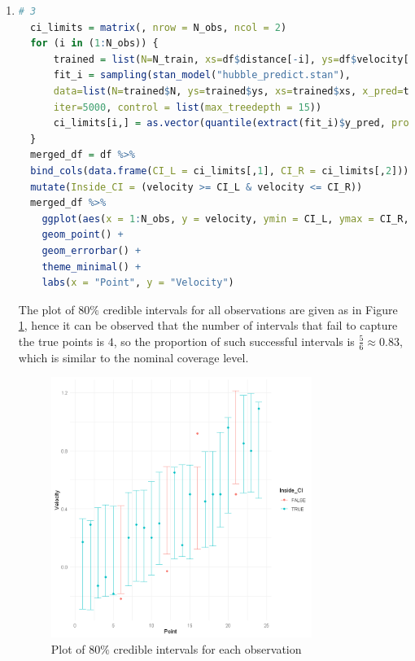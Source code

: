 \documentclass{article}
\begin{document}
\begin{enumerate}
\item 
\begin{lstlisting}[language=R]
  # 3
  ci_limits = matrix(, nrow = N_obs, ncol = 2)
  for (i in (1:N_obs)) {
      trained = list(N=N_train, xs=df$distance[-i], ys=df$velocity[-i], x_pred=df$distance[i])
      fit_i = sampling(stan_model("hubble_predict.stan"), 
      data=list(N=trained$N, ys=trained$ys, xs=trained$xs, x_pred=trained$x_pred), 
      iter=5000, control = list(max_treedepth = 15))
      ci_limits[i,] = as.vector(quantile(extract(fit_i)$y_pred, prob=c(0.1, 0.9)))
  }
  merged_df = df %>% 
  bind_cols(data.frame(CI_L = ci_limits[,1], CI_R = ci_limits[,2])) %>% 
  mutate(Inside_CI = (velocity >= CI_L & velocity <= CI_R)) 
  merged_df %>% 
    ggplot(aes(x = 1:N_obs, y = velocity, ymin = CI_L, ymax = CI_R, color=Inside_CI)) +
    geom_point() + 
    geom_errorbar() +
    theme_minimal() +
    labs(x = "Point", y = "Velocity")
\end{lstlisting}
The plot of $80\%$ credible intervals for all observations are given as in Figure \ref{fig:ci}, hence it can be observed that the number of intervals that fail to capture the true points is $4$, so the proportion of such successful intervals is $\frac56 \approx 0.83$, which is similar to the nominal coverage level.
\begin{figure}[H]
  \centering
  \includegraphics[width=0.8\textwidth, height=0.4\textheight]{ci.png}
  \caption{Plot of $80\%$ credible intervals for each observation}
  \label{fig:ci}
\end{figure}

\end{enumerate}
\end{document}
